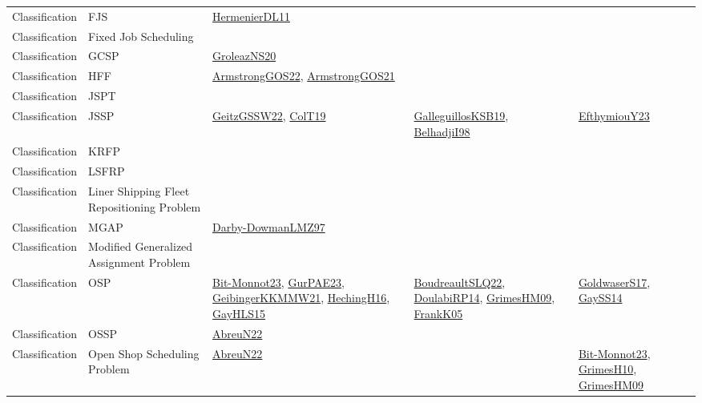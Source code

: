 {\begin{longtable}{lp{3cm}>{\raggedright}p{6cm}>{\raggedright}p{6cm}p{8cm}}
Classification & FJS & \href{papers/HermenierDL11.pdf}{HermenierDL11}\cite{HermenierDL11} &  & \\
Classification & Fixed Job Scheduling &  &  & \\
Classification & GCSP & \href{papers/GroleazNS20.pdf}{GroleazNS20}\cite{GroleazNS20} &  & \\
Classification & HFF & \href{papers/ArmstrongGOS22.pdf}{ArmstrongGOS22}\cite{ArmstrongGOS22}, \href{papers/ArmstrongGOS21.pdf}{ArmstrongGOS21}\cite{ArmstrongGOS21} &  & \\
Classification & JSPT &  &  & \\
Classification & JSSP & \href{papers/GeitzGSSW22.pdf}{GeitzGSSW22}\cite{GeitzGSSW22}, \href{papers/ColT19.pdf}{ColT19}\cite{ColT19} & \href{papers/GalleguillosKSB19.pdf}{GalleguillosKSB19}\cite{GalleguillosKSB19}, \href{articles/BelhadjiI98.pdf}{BelhadjiI98}\cite{BelhadjiI98} & \href{papers/EfthymiouY23.pdf}{EfthymiouY23}\cite{EfthymiouY23}\\
Classification & KRFP &  &  & \\
Classification & LSFRP &  &  & \\
Classification & Liner Shipping Fleet Repositioning Problem &  &  & \\
Classification & MGAP & \href{articles/Darby-DowmanLMZ97.pdf}{Darby-DowmanLMZ97}\cite{Darby-DowmanLMZ97} &  & \\
Classification & Modified Generalized Assignment Problem &  &  & \\
Classification & OSP & \href{papers/Bit-Monnot23.pdf}{Bit-Monnot23}\cite{Bit-Monnot23}, \href{articles/GurPAE23.pdf}{GurPAE23}\cite{GurPAE23}, \href{papers/GeibingerKKMMW21.pdf}{GeibingerKKMMW21}\cite{GeibingerKKMMW21}, \href{papers/HechingH16.pdf}{HechingH16}\cite{HechingH16}, \href{papers/GayHLS15.pdf}{GayHLS15}\cite{GayHLS15} & \href{papers/BoudreaultSLQ22.pdf}{BoudreaultSLQ22}\cite{BoudreaultSLQ22}, \href{papers/DoulabiRP14.pdf}{DoulabiRP14}\cite{DoulabiRP14}, \href{papers/GrimesHM09.pdf}{GrimesHM09}\cite{GrimesHM09}, \href{papers/FrankK05.pdf}{FrankK05}\cite{FrankK05} & \href{papers/GoldwaserS17.pdf}{GoldwaserS17}\cite{GoldwaserS17}, \href{papers/GaySS14.pdf}{GaySS14}\cite{GaySS14}\\
Classification & OSSP & \href{articles/AbreuN22.pdf}{AbreuN22}\cite{AbreuN22} &  & \\
Classification & Open Shop Scheduling Problem & \href{articles/AbreuN22.pdf}{AbreuN22}\cite{AbreuN22} &  & \href{papers/Bit-Monnot23.pdf}{Bit-Monnot23}\cite{Bit-Monnot23}, \href{papers/GrimesH10.pdf}{GrimesH10}\cite{GrimesH10}, \href{papers/GrimesHM09.pdf}{GrimesHM09}\cite{GrimesHM09}\\

\end{longtable}}
